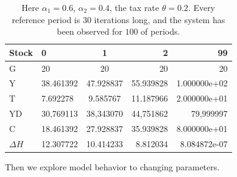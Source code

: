 \documentclass[10pt,a4paper]{article}
\begin{document}
\begin{table}[h]
\centering
\begin{tabular}{llcrr}
\toprule
Stock & 0 & 1 & 2 & 99\\
\midrule
G & 20 & 20 & 20 & 20\\
Y & 38.461392 & 47.928837 &	55.939828 &	1.000000e+02 \\
T &	7.692278 &	9.585767 &	11.187966 &	2.000000e+01 \\
YD & 30,769113 &	38,343070 &	44,751862 &	79,999997 \\
C &	18.461392 & 27.928837 &	35.939828 &	8.000000e+01 \\
$\Delta H$ &	12.307722 &	10.414233 &	8.812034 &	8.084872e-07 \\
\bottomrule
\end{tabular} 
\caption{Here $\alpha_1 = 0.6$, $\alpha_2 = 0.4$, the tax rate $\theta = 0.2$. Every reference period is $30$ iterations long, and the system has been observed for $100$ of periods.}
\end{table}

Then we explore model behavior to changing parameters.
\end{document}
